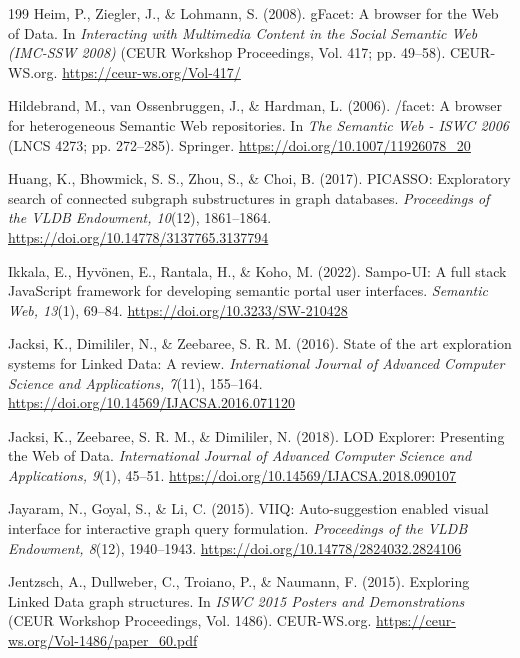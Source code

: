 \documentclass[manuscript,review,screen]{acmart}
\begin{document}
\begin{thebibliography}{199}
 Heim, P., Ziegler, J., \& Lohmann, S. (2008). gFacet: A browser for the Web of Data. In \textit{Interacting with Multimedia Content in the Social Semantic Web (IMC-SSW 2008)} (CEUR Workshop Proceedings, Vol. 417; pp. 49--58). CEUR-WS.org. \url{https://ceur-ws.org/Vol-417/}

 Hildebrand, M., van Ossenbruggen, J., \& Hardman, L. (2006). /facet: A browser for heterogeneous Semantic Web repositories. In \textit{The Semantic Web - ISWC 2006} (LNCS 4273; pp. 272--285). Springer. \url{https://doi.org/10.1007/11926078_20}

 Huang, K., Bhowmick, S. S., Zhou, S., \& Choi, B. (2017). PICASSO: Exploratory search of connected subgraph substructures in graph databases. \textit{Proceedings of the VLDB Endowment, 10}(12), 1861--1864. \url{https://doi.org/10.14778/3137765.3137794}

 Ikkala, E., Hyv\"{o}nen, E., Rantala, H., \& Koho, M. (2022). Sampo-UI: A full stack JavaScript framework for developing semantic portal user interfaces. \textit{Semantic Web, 13}(1), 69--84. \url{https://doi.org/10.3233/SW-210428}

 Jacksi, K., Dimililer, N., \& Zeebaree, S. R. M. (2016). State of the art exploration systems for Linked Data: A review. \textit{International Journal of Advanced Computer Science and Applications, 7}(11), 155--164. \url{https://doi.org/10.14569/IJACSA.2016.071120}

 Jacksi, K., Zeebaree, S. R. M., \& Dimililer, N. (2018). LOD Explorer: Presenting the Web of Data. \textit{International Journal of Advanced Computer Science and Applications, 9}(1), 45--51. \url{https://doi.org/10.14569/IJACSA.2018.090107}

 Jayaram, N., Goyal, S., \& Li, C. (2015). VIIQ: Auto-suggestion enabled visual interface for interactive graph query formulation. \textit{Proceedings of the VLDB Endowment, 8}(12), 1940--1943. \url{https://doi.org/10.14778/2824032.2824106}

 Jentzsch, A., Dullweber, C., Troiano, P., \& Naumann, F. (2015). Exploring Linked Data graph structures. In \textit{ISWC 2015 Posters and Demonstrations} (CEUR Workshop Proceedings, Vol. 1486). CEUR-WS.org. \url{https://ceur-ws.org/Vol-1486/paper_60.pdf}


\end{thebibliography}
\end{document}
